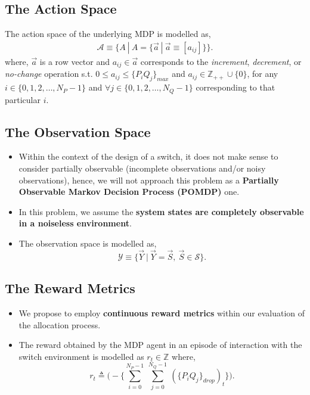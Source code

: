 \documentclass{article}
\begin{document}
\subsection{The Action Space}
The action space of the underlying MDP is modelled as,
\begin{equation}
    \begin{aligned}
        \mathcal{A} \equiv \{A\ |\ A = \{\vec{a} \ |\ \vec{a} \equiv [a_{ij}]\}\}.
    \end{aligned}
\end{equation}
where, $\vec{a}$ is a row vector and $a_{ij} \in \vec{a}$ corresponds to the \textit{increment}, \textit{decrement}, or \textit{no-change} operation s.t. $0 \leq a_{ij} \leq \{P_i Q_j\}_{max}$ and $a_{ij} \in \mathbb{Z}_{++} \cup \{0\}$, for any $i \in \{0, 1, 2, \dots, N_P-1\}$ and $\forall j \in \{0, 1, 2, \dots, N_Q-1\}$ corresponding to that particular $i$.
\subsection{The Observation Space}
\begin{itemize}
    \item Within the context of the design of a switch, it does not make sense to consider partially observable (incomplete observations and/or noisy observations), hence, we will not approach this problem as a \textbf{Partially Observable Markov Decision Process (POMDP)} one.
    \item In this problem, we assume the \textbf{system states are completely observable in a noiseless environment}.
    \item The observation space is modelled as,
    \begin{equation}
        \mathcal{Y} \equiv \{\vec{Y}\ |\ \vec{Y} = \vec{S},\ \vec{S} \in \mathcal{S}\}.
    \end{equation}
\end{itemize}
\subsection{The Reward Metrics}
\begin{itemize}
    \item We propose to employ \textbf{continuous reward metrics} within our evaluation of the allocation process.
    \item The reward obtained by the MDP agent in an episode of interaction with the switch environment is modelled as $r_t \in \mathbb{Z}$ where,
    \begin{equation}
        r_{t} \triangleq \Big(- \Big\{\sum_{i=0}^{N_P-1}\ \sum_{j=0}^{N_Q-1}\ (\{P_i Q_j\}_{drop})_t\Big\}\Big).
    \end{equation}
\end{itemize}
\end{document}
